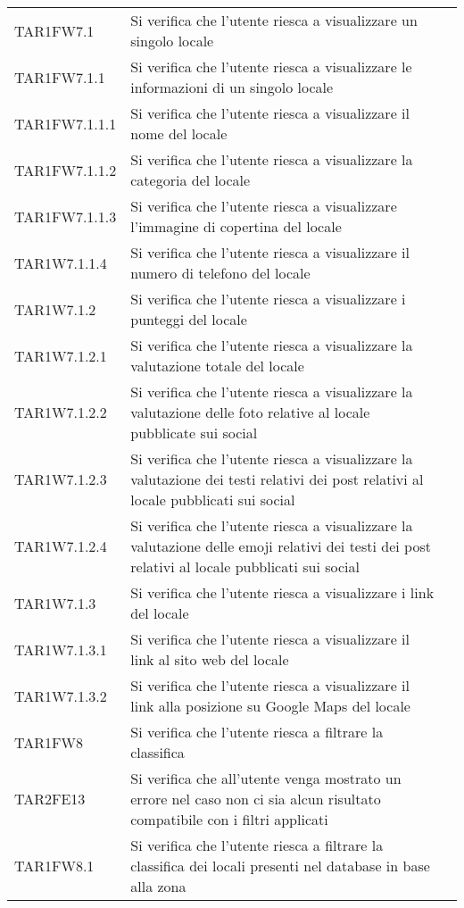 \begin{longtable}{ m{}<{\centering}  m{}<{\centering}  m{}<{\centering} }
	TAR1FW7.1 & Si verifica che l'utente riesca a visualizzare un singolo locale & \Su \\
	TAR1FW7.1.1 & Si verifica che l'utente riesca a visualizzare le informazioni di un singolo locale & \Su \\
	TAR1FW7.1.1.1 & Si verifica che l'utente riesca a visualizzare il nome del locale & \Su \\
	TAR1FW7.1.1.2 & Si verifica che l'utente riesca a visualizzare la categoria del locale & \Su \\
	TAR1FW7.1.1.3 & Si verifica che l'utente riesca a visualizzare l'immagine di copertina del locale & \Su \\
	TAR1W7.1.1.4 & Si verifica che l'utente riesca a visualizzare il numero di telefono del locale & \Su \\
	TAR1W7.1.2 & Si verifica che l'utente riesca a visualizzare i punteggi del locale & \Su \\
	TAR1W7.1.2.1 & Si verifica che l'utente riesca a visualizzare la valutazione totale del locale & \Su \\
	TAR1W7.1.2.2	& Si verifica che l'utente riesca a visualizzare la valutazione delle foto relative al locale pubblicate sui social & \Su \\
	TAR1W7.1.2.3	& Si verifica che l'utente riesca a visualizzare la valutazione dei testi relativi dei post relativi al locale pubblicati sui social & \Su \\
	TAR1W7.1.2.4	& Si verifica che l'utente riesca a visualizzare la valutazione delle emoji relativi dei testi dei post relativi al locale pubblicati sui social & \Su \\
	TAR1W7.1.3	& Si verifica che l'utente riesca a visualizzare i link del locale & \Su \\
	TAR1W7.1.3.1 & Si verifica che l'utente riesca a visualizzare il link al sito web del locale & \Su \\
	TAR1W7.1.3.2 & Si verifica che l'utente riesca a visualizzare il link alla posizione su Google Maps del locale & \Su \\
	TAR1FW8 & Si verifica che l'utente riesca a filtrare la classifica & \Su \\
	TAR2FE13 & Si verifica che all'utente venga mostrato un errore nel caso non ci sia alcun risultato compatibile con i filtri applicati & \Su \\
	TAR1FW8.1 & Si verifica che l'utente riesca a filtrare la classifica dei locali presenti nel database in base alla zona & \Su \\

\end{longtable}
